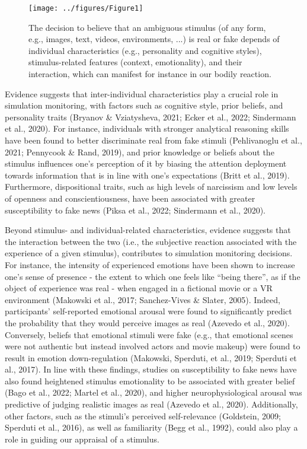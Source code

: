 \documentclass[
  man,floatsintext]{apa6}
\begin{document}
\begin{figure}
\texttt{[image: ../figures/Figure1]} \caption{The decision to believe that an ambiguous stimulus (of any form, e.g., images, text, videos, environments, ...) is real or fake depends of individual characteristics (e.g., personality and cognitive styles), stimulus-related features (context, emotionality), and their interaction, which can manifest for instance in our bodily reaction.}\label{fig:unnamed-chunk-2}
\end{figure}

Evidence suggests that inter-individual characteristics play a crucial role in simulation monitoring, with factors such as cognitive style, prior beliefs, and personality traits (Bryanov \& Vziatysheva, 2021; Ecker et al., 2022; Sindermann et al., 2020). For instance, individuals with stronger analytical reasoning skills have been found to better discriminate real from fake stimuli (Pehlivanoglu et al., 2021; Pennycook \& Rand, 2019), and prior knowledge or beliefs about the stimulus influences one's perception of it by biasing the attention deployment towards information that is in line with one's expectations (Britt et al., 2019). Furthermore, dispositional traits, such as high levels of narcissism and low levels of openness and conscientiousness, have been associated with greater susceptibility to fake news (Piksa et al., 2022; Sindermann et al., 2020).

Beyond stimulus- and individual-related characteristics, evidence suggests that the interaction between the two (i.e., the subjective reaction associated with the experience of a given stimulus), contributes to simulation monitoring decisions. For instance, the intensity of experienced emotions have been shown to increase one's sense of presence - the extent to which one feels like ``being there'', as if the object of experience was real - when engaged in a fictional movie or a VR environment (Makowski et al., 2017; Sanchez-Vives \& Slater, 2005). Indeed, participants' self-reported emotional arousal were found to significantly predict the probability that they would perceive images as real (Azevedo et al., 2020). Conversely, beliefs that emotional stimuli were fake (e.g., that emotional scenes were not authentic but instead involved actors and movie makeup) were found to result in emotion down-regulation (Makowski, Sperduti, et al., 2019; Sperduti et al., 2017). In line with these findings, studies on susceptibility to fake news have also found heightened stimulus emotionality to be associated with greater belief (Bago et al., 2022; Martel et al., 2020), and higher neurophysiological arousal was predictive of judging realistic images as real (Azevedo et al., 2020). Additionally, other factors, such as the stimuli's perceived self-relevance (Goldstein, 2009; Sperduti et al., 2016), as well as familiarity (Begg et al., 1992), could also play a role in guiding our appraisal of a stimulus.
\end{document}
